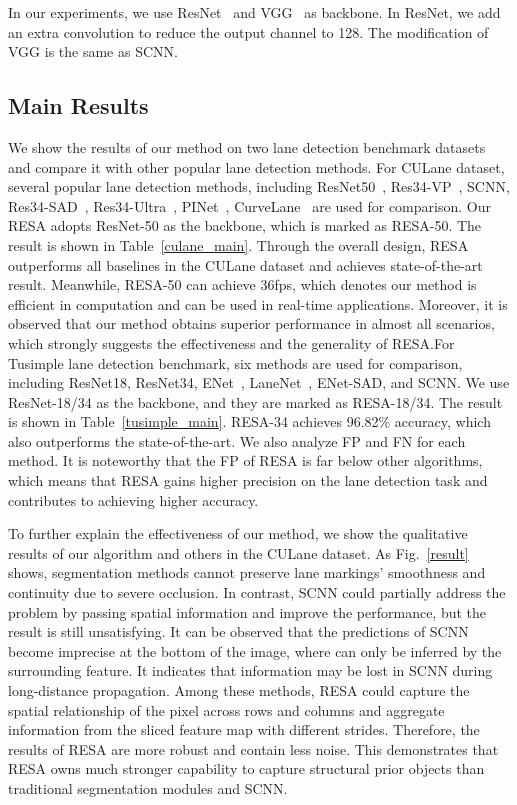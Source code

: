 \documentclass[letterpaper]{article} \usepackage{aaai21}  \usepackage{times}  \usepackage{helvet} \usepackage{courier}  \usepackage[hyphens]{url}  \usepackage{graphicx} \urlstyle{rm} \def\UrlFont{\rm}  \usepackage{natbib}  \usepackage{caption} \frenchspacing  \setlength{\pdfpagewidth}{8.5in}  \setlength{\pdfpageheight}{11in}  \usepackage{amsmath}
\begin{document}
In our experiments, we use ResNet~\citep{he2016deep} and VGG~\citep{simonyan2014very} as backbone. In ResNet, we add an extra  convolution to reduce the output channel to 128. The modification of VGG is the same as SCNN.

\subsection{Main Results}
We show the results of our method on two lane detection benchmark datasets and compare it with other popular lane detection methods. For CULane dataset, several popular lane detection methods, including ResNet50~\citep{chen2017deeplab}, Res34-VP~\citep{liu2020heatmap}, SCNN, Res34-SAD~\citep{hou2019learning}, Res34-Ultra~\citep{qin2020ultra}, PINet~\citep{ko2020key}, CurveLane~\citep{xu2020curvelane} are used for comparison. Our RESA adopts ResNet-50 as the backbone, which is marked as RESA-50. The result is shown in Table~\ref{culane_main}. Through the overall design, RESA outperforms all baselines in the CULane dataset and achieves state-of-the-art result. Meanwhile, RESA-50 can achieve 36fps, which denotes our method is efficient in computation and can be used in real-time applications. Moreover, it is observed that our method obtains superior performance in almost all scenarios, which strongly suggests the effectiveness and the generality of RESA.For Tusimple lane detection benchmark, six methods are used for comparison, including ResNet18, ResNet34, ENet~\citep{paszke2016enet}, LaneNet~\citep{wang2018lanenet}, ENet-SAD, and SCNN. We use ResNet-18/34 as the backbone, and they are marked as RESA-18/34. The result is shown in Table~\ref{tusimple_main}. RESA-34 achieves 96.82\% accuracy, which also outperforms the state-of-the-art. We also analyze FP and FN for each method. It is noteworthy that the FP of RESA is far below other algorithms, which means that RESA gains higher precision on the lane detection task and contributes to achieving higher accuracy.

To further explain the effectiveness of our method, we show the qualitative results of our algorithm and others in the CULane dataset. As Fig.~\ref{result} shows, segmentation methods cannot preserve lane markings' smoothness and continuity due to severe occlusion. In contrast, SCNN could partially address the problem by passing spatial information and improve the performance, but the result is still unsatisfying. It can be observed that the predictions of SCNN become imprecise at the bottom of the image, where can only be inferred by the surrounding feature. It indicates that information may be lost in SCNN during long-distance propagation. Among these methods, RESA could capture the spatial relationship of the pixel across rows and columns and aggregate information from the sliced feature map with different strides. Therefore, the results of RESA are more robust and contain less noise. This demonstrates that RESA owns much stronger capability to capture structural prior objects than traditional segmentation modules and SCNN.
\end{document}
